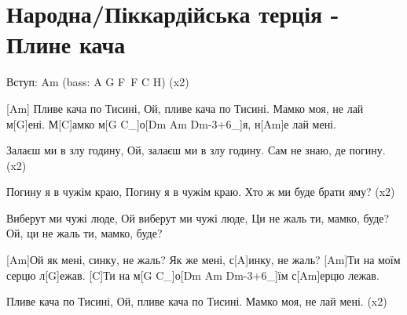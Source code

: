 \section{Народна/Піккардійська терція - Плине кача}
\begin{guitar}

Вступ: Am (bass: A G F\guitarSharp\ F C H)  (x2)

[Am] Пливе кача по Тисині,
Ой, пливе кача по Тисині.
Мамко моя, не лай м[G]ені.
М[C]амко м[G C_]о[Dm Am Dm-3+6_]я, н[Am]е лай мені.

Залаєш ми в злу годину,
Ой, залаєш ми в злу годину.
Сам не знаю, де погину.   (x2)

Погину я в чужім краю,
Погину я в чужім краю.
Хто ж ми буде брати яму?  (x2)

Виберут ми чужі люде,
Ой виберут ми чужі люде,
Ци не жаль ти, мамко, буде?
Ой, ци не жаль ти, мамко, буде?

[Am]Ой як мені, синку, не жаль?
Як же мені, с[A]инку, не жаль?
[Am]Ти на моїм серцю л[G]ежав.
[C]Ти на м[G C_]о[Dm Am Dm-3+6_]їм с[Am]ерцю лежав.

Пливе кача по Тисині,
Ой, пливе кача по Тисині.
Мамко моя, не лай мені.   (x2)
\end{guitar}
